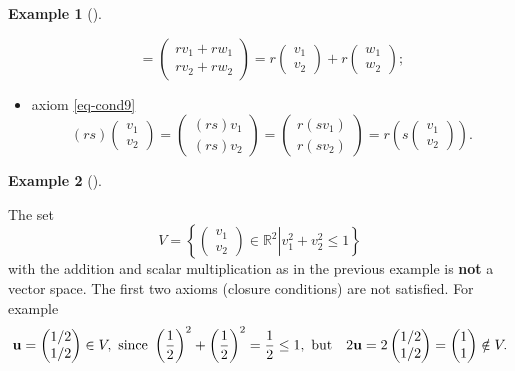 \documentclass[
  a4paper,
  DIV=11,
  numbers=noendperiod,
  oneside]{scrreprt}
\theoremstyle{definition}
\newtheorem{example}{Example}[chapter]
\theoremstyle{remark}
\begin{document}
\begin{example}[]
\begin{itemize}
\[    =\begin{pmatrix}   rv_1+rw_1 \\ rv_2+rw_2  \end{pmatrix} 
    =r \begin{pmatrix}   v_1 \\ v_2  \end{pmatrix} +r \begin{pmatrix}   w_1 \\ w_2  \end{pmatrix}; \]
\item
  axiom \ref{eq-cond9}
  \[(rs) \begin{pmatrix}   v_1 \\ v_2  \end{pmatrix} 
    = \begin{pmatrix}   (rs)v_1 \\ (rs)v_2  \end{pmatrix} 
    =\begin{pmatrix}   r(sv_1) \\ r(sv_2)  \end{pmatrix} 
    =r \left(s \begin{pmatrix}   v_1 \\ v_2  \end{pmatrix} \right).\]
\end{itemize}

\end{example}

\begin{example}[]\protect\hypertarget{exm-vktspace2}{}\label{exm-vktspace2}

The set
\[V= \left\{ \left.  \begin{pmatrix}   v_{1}\\ v_{2}  \end{pmatrix}  \in \mathbb{R}^2 \right|  v_1^2+v_2^2 \le 1\right\}\]
with the addition and scalar multiplication as in the previous example
is \textbf{not} a vector space. The first two axioms (closure
conditions) are not satisfied. For example
\[{\bf u}=  \begin{pmatrix}   1/2\\ 1/2  \end{pmatrix}  \in V, \ \text{since} \    \left(\frac{1}{2}\right)^2+\left(\frac{1}{2}\right)^2 = \frac{1}{2} \le 1, \  \text{but} \quad  2{\bf u}= 2  \begin{pmatrix}   1/2\\ 1/2  \end{pmatrix}  = \begin{pmatrix}   1\\ 1  \end{pmatrix}   \notin V.\]

\end{example}
\end{document}
